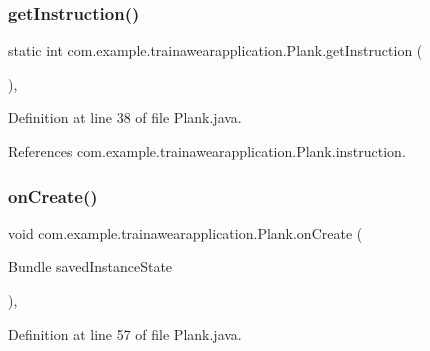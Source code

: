 \subsubsection{\texorpdfstring{getInstruction()}{getInstruction()}}
{\footnotesize\ttfamily static int com.\+example.\+trainawearapplication.\+Plank.\+get\+Instruction (\begin{DoxyParamCaption}{ }\end{DoxyParamCaption})\hspace{0.3cm}{\ttfamily [inline]}, {\ttfamily [static]}}



Definition at line 38 of file Plank.\+java.


\begin{DoxyCode}{0}

\end{DoxyCode}


References com.\+example.\+trainawearapplication.\+Plank.\+instruction.

\mbox{\label{classcom_1_1example_1_1trainawearapplication_1_1_plank_a8071af6c71d817914e58bd99b92c0904}} 
\subsubsection{\texorpdfstring{onCreate()}{onCreate()}}
{\footnotesize\ttfamily void com.\+example.\+trainawearapplication.\+Plank.\+on\+Create (\begin{DoxyParamCaption}\item[{Bundle}]{saved\+Instance\+State }\end{DoxyParamCaption})\hspace{0.3cm}{\ttfamily [inline]}, {\ttfamily [protected]}}



Definition at line 57 of file Plank.\+java.


